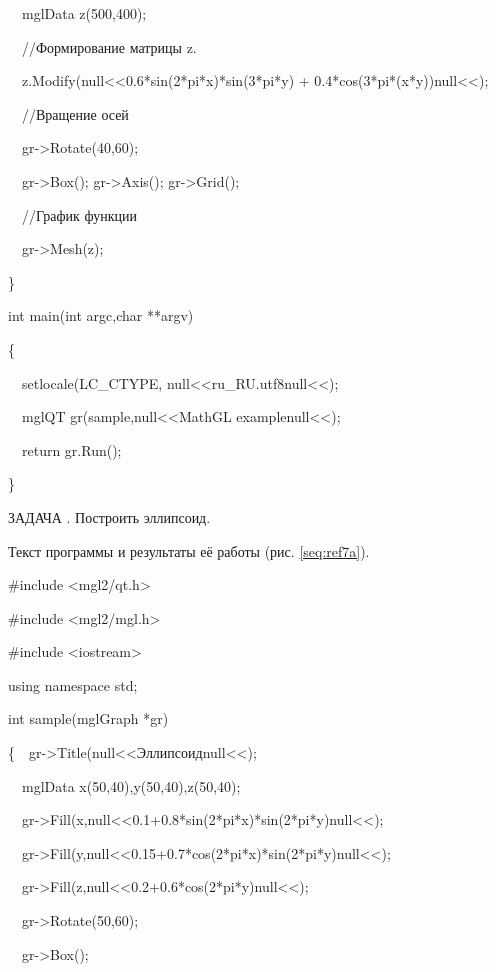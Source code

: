 {\upshape
\ \ mglData z(500,400);}

{\upshape
\ \ //Формирование матрицы z.}

{\upshape
\ \ z.Modify(null{<<}0.6*sin(2*pi*x)*sin(3*pi*y) + 0.4*cos(3*pi*(x*y))null{<<});}

{\upshape
\ \ //Вращение осей}

{\upshape
\ \ gr-{\textgreater}Rotate(40,60);}

{\upshape
\ \ gr-{\textgreater}Box(); gr-{\textgreater}Axis(); gr-{\textgreater}Grid();}

{\upshape
\ \ //График функции}

{\upshape
\ \ gr-{\textgreater}Mesh(z);}

\}

{\upshape
int main(int argc,char **argv)}

{\upshape
\{}

{\upshape
\ \ setlocale(LC\_CTYPE, null{<<}ru\_RU.utf8null{<<});}

{\upshape
\ \ mglQT gr(sample,null{<<}MathGL examplenull{<<});}

{\upshape
\ \ return gr.Run();}

\}

ЗАДАЧА {\theqwerty\label{seq:ref7}}. Построить эллипсоид.

Текст программы и результаты её работы (рис. \ref{seq:ref7a}).

{\upshape
\#include {\textless}mgl2/qt.h{\textgreater}}

{\upshape
\#include {\textless}mgl2/mgl.h{\textgreater}}

{\upshape
\#include {\textless}iostream{\textgreater}}

{\upshape
using namespace std;}

{\upshape
int sample(mglGraph *gr)}

{\upshape
\{\ \ gr-{\textgreater}Title(null{<<}Эллипсоидnull{<<});}

{\upshape
\ \ mglData x(50,40),y(50,40),z(50,40);}

{\upshape
\ \ gr-{\textgreater}Fill(x,null{<<}0.1+0.8*sin(2*pi*x)*sin(2*pi*y)null{<<});}

{\upshape
\ \ gr-{\textgreater}Fill(y,null{<<}0.15+0.7*cos(2*pi*x)*sin(2*pi*y)null{<<});}

{\upshape
\ \ gr-{\textgreater}Fill(z,null{<<}0.2+0.6*cos(2*pi*y)null{<<});}

{\upshape
\ \ gr-{\textgreater}Rotate(50,60);}

{\upshape
\ \ gr-{\textgreater}Box();}

